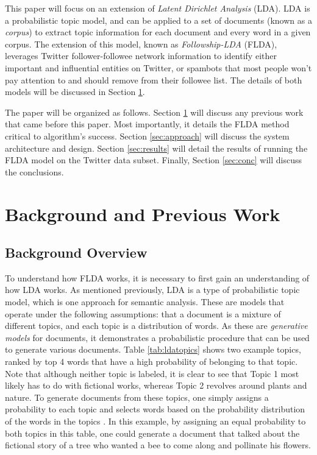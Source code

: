 \documentclass[a4paper]{article}
\begin{document}
This paper will focus on an extension of \textit{Latent Dirichlet Analysis} (LDA). LDA is a probabilistic topic model, and can be applied to a set of documents (known as a \textit{corpus}) to extract topic information for each document and every word in a given corpus. The extension of this model, known as \textit{Followship-LDA} (FLDA), leverages Twitter follower-followee network information to identify either important and influential entities on Twitter, or spambots that most people won't pay attention to and should remove from their followee list. The details of both models will be discussed in Section \ref{sec:prevwork}.

The paper will be organized as follows. Section \ref{sec:prevwork} will discuss any previous work that came before this paper. Most importantly, it details the FLDA method critical to algorithm's success. Section \ref{sec:approach} will discuss the system architecture and design. Section \ref{sec:results} will detail the results of running the FLDA model on the Twitter data subset. Finally, Section \ref{sec:conc} will discuss the conclusions.



\section{Background and Previous Work}
\label{sec:prevwork}
\subsection{Background Overview}
To understand how FLDA works, it is necessary to first gain an understanding of how LDA works. As mentioned previously, LDA is a type of probabilistic topic model, which is one approach for semantic analysis. These are models that operate under the following assumptions: that a document is a mixture of different topics, and each topic is a distribution of words. As these are \textit{generative models} for documents, it demonstrates a probabilistic procedure that can be used to generate various documents. Table \ref{tab:ldatopics} shows two example topics, ranked by top 4 words that have a high probability of belonging to that topic. Note that although neither topic is labeled, it is clear to see that Topic 1 most likely has to do with fictional works, whereas Topic 2 revolves around plants and nature. To generate documents from these topics, one simply assigns a probability to each topic and selects words based on the probability distribution of the words in the topics \cite{lda}. In this example, by assigning an equal probability to both topics in this table, one could generate a document that talked about the fictional story of a tree who wanted a bee to come along and pollinate his flowers.
\end{document}
